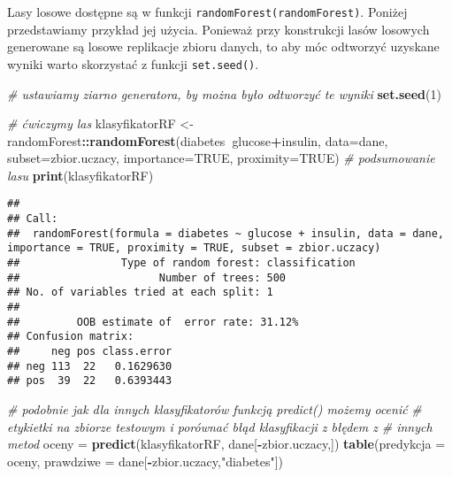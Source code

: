 \documentclass[polish,]{book}
\newenvironment{Shaded}{\begin{snugshade}}{\end{snugshade}}
\newcommand{\CommentTok}[1]{\textcolor[rgb]{0.56,0.35,0.01}{\textit{#1}}}
\newcommand{\DataTypeTok}[1]{\textcolor[rgb]{0.13,0.29,0.53}{#1}}
\newcommand{\DecValTok}[1]{\textcolor[rgb]{0.00,0.00,0.81}{#1}}
\newcommand{\KeywordTok}[1]{\textcolor[rgb]{0.13,0.29,0.53}{\textbf{#1}}}
\newcommand{\NormalTok}[1]{#1}
\newcommand{\OperatorTok}[1]{\textcolor[rgb]{0.81,0.36,0.00}{\textbf{#1}}}
\newcommand{\OtherTok}[1]{\textcolor[rgb]{0.56,0.35,0.01}{#1}}
\newcommand{\StringTok}[1]{\textcolor[rgb]{0.31,0.60,0.02}{#1}}
\begin{document}
Lasy losowe dostępne są w funkcji \texttt{randomForest(randomForest)}. Poniżej przedstawiamy przykład jej użycia. Ponieważ przy konstrukcji lasów losowych generowane
są losowe replikacje zbioru danych, to aby móc odtworzyć uzyskane wyniki warto
skorzystać z funkcji \texttt{set.seed()}.

\begin{Shaded}
\begin{Highlighting}[]
\CommentTok{# ustawiamy ziarno generatora, by można było odtworzyć te wyniki}
\KeywordTok{set.seed}\NormalTok{(}\DecValTok{1}\NormalTok{)}

\CommentTok{# ćwiczymy las}
\NormalTok{klasyfikatorRF <-}\StringTok{ }\NormalTok{randomForest}\OperatorTok{::}\KeywordTok{randomForest}\NormalTok{(diabetes}\OperatorTok{~}\NormalTok{glucose}\OperatorTok{+}\NormalTok{insulin,}
                                             \DataTypeTok{data=}\NormalTok{dane,}
                                             \DataTypeTok{subset=}\NormalTok{zbior.uczacy, }\DataTypeTok{importance=}\OtherTok{TRUE}\NormalTok{, }\DataTypeTok{proximity=}\OtherTok{TRUE}\NormalTok{)}
\CommentTok{# podsumowanie lasu}
\KeywordTok{print}\NormalTok{(klasyfikatorRF)}
\end{Highlighting}
\end{Shaded}

\begin{verbatim}
## 
## Call:
##  randomForest(formula = diabetes ~ glucose + insulin, data = dane,      importance = TRUE, proximity = TRUE, subset = zbior.uczacy) 
##                Type of random forest: classification
##                      Number of trees: 500
## No. of variables tried at each split: 1
## 
##         OOB estimate of  error rate: 31.12%
## Confusion matrix:
##     neg pos class.error
## neg 113  22   0.1629630
## pos  39  22   0.6393443
\end{verbatim}

\begin{Shaded}
\begin{Highlighting}[]
\CommentTok{# podobnie jak dla innych klasyfikatorów funkcją predict() możemy ocenić}
\CommentTok{# etykietki na zbiorze testowym i porównać błąd klasyfikacji z błędem z}
\CommentTok{# innych metod}
\NormalTok{oceny =}\StringTok{ }\KeywordTok{predict}\NormalTok{(klasyfikatorRF, dane[}\OperatorTok{-}\NormalTok{zbior.uczacy,])}
\KeywordTok{table}\NormalTok{(}\DataTypeTok{predykcja =}\NormalTok{ oceny, }\DataTypeTok{prawdziwe =}\NormalTok{ dane[}\OperatorTok{-}\NormalTok{zbior.uczacy,}\StringTok{"diabetes"}\NormalTok{])}
\end{Highlighting}
\end{Shaded}
\end{document}
